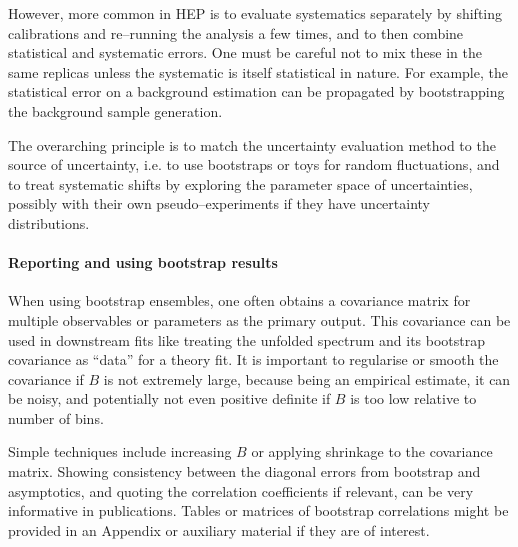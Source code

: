             However, more common in HEP is to evaluate systematics separately by shifting calibrations and re--running the analysis a few times, and to then combine statistical and systematic errors.
            One must be careful not to mix these in the same replicas unless the systematic is itself statistical in nature.
            For example, the statistical error on a background estimation can be propagated by bootstrapping the background sample generation.
            
            The overarching principle is to match the uncertainty evaluation method to the source of uncertainty, i.e. to use bootstraps or toys for random fluctuations, and to treat systematic shifts by exploring the parameter space of uncertainties, possibly with their own pseudo--experiments if they have uncertainty distributions.
            
        \paragraph{Reporting and using bootstrap results}
            When using bootstrap ensembles, one often obtains a covariance matrix for multiple observables or parameters as the primary output.
            This covariance can be used in downstream fits like treating the unfolded spectrum and its bootstrap covariance as ``data'' for a theory fit.
            It is important to regularise or smooth the covariance if $B$ is not extremely large, because being an empirical estimate, it can be noisy, and potentially not even positive definite if $B$ is too low relative to number of bins.
            
            Simple techniques include increasing $B$ or applying shrinkage to the covariance matrix.
            Showing consistency between the diagonal errors from bootstrap and asymptotics, and quoting the correlation coefficients if relevant, can be very informative  in publications.
            Tables or matrices of bootstrap correlations might be provided in an Appendix or auxiliary material if they are of interest.
            
